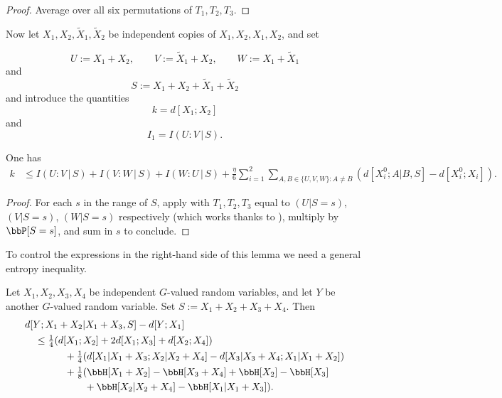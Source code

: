 \begin{proof}\leanok
Average  over all six permutations of $T_1,T_2,T_3$.
\end{proof}

Now let $X_1, X_2, \tilde X_1, \tilde X_2$ be independent copies of $X_1, X_2, X_1, X_2$, and set

\[U := X_1 + X_2, \qquad V := \tilde X_1 + X_2, \qquad W := X_1 + \tilde X_1\] and
\[  S := X_1 + X_2 + \tilde X_1 + \tilde X_2\]
and introduce the quantities
$$ k = d[X_1;X_2]$$
and
$$ I_1 = I(U : V \, | \, S).$$

\begin{lemma}\label{averaged-construct-good}\leanok
  One has
  \begin{align*}  k & \leq I(U : V \, | \, S) + I(V : W \, | \,S) + I(W : U \, | \, S) + \frac{\eta}{6}  \sum_{i=1}^2 \sum_{A,B \in \{U,V,W\}: A \neq B} (d[X^0_i;A|B,S] - d[X^0_i; X_i]).
    \end{align*}
\end{lemma}

\begin{proof}\leanok  For each $s$ in the range of $S$, apply  with $T_1,T_2,T_3$ equal to $(U|S=s)$, $(V|S=s)$, $(W|S=s)$ respectively (which works thanks to ), multiply by $\bbP[S=s]$, and sum in $s$ to conclude.
\end{proof}

To control the expressions in the right-hand side of this lemma we need a general entropy inequality.

\begin{lemma}\label{gen-ineq} \leanok
Let $X_1, X_2, X_3, X_4$ be independent $G$-valued random variables, and let $Y$ be another $G$-valued random variable.  Set $S := X_1+X_2+X_3+X_4$. Then
  \begin{align*}
    &  d[Y; X_1+X_2|X_1 + X_3, S] - d[Y; X_1] \\
    &\quad \leq \tfrac{1}{4} (d[X_1;X_2] + 2d[X_1;X_3] + d[X_2;X_4])\\
    &\qquad \qquad + \tfrac{1}{4} (d[X_1|X_1+X_3;X_2|X_2+X_4] - d[X_3|X_3+X_4; X_1|X_1+X_2])\\
    &\qquad \qquad + \tfrac{1}{8} (\bbH[X_1+X_2] - \bbH[X_3+X_4] + \bbH[X_2] - \bbH[X_3]\\
    &\qquad \qquad \qquad + \bbH[X_2|X_2+X_4] - \bbH[X_1|X_1+X_3]).
\end{align*}
\end{lemma}

